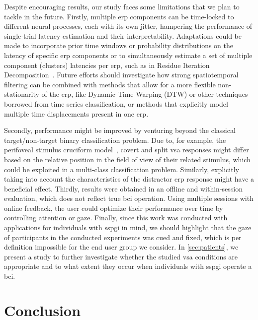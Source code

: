 Despite encouraging results, our study faces some limitations that we plan to
tackle in the future.
Firstly, multiple \ac{erp} components can be time-locked to different neural
processes, each with its own jitter, hampering the performance of
single-trial latency estimation and their interpretability.
Adaptations could be made to incorporate prior time windows or probability
distributions on the latency of specific \ac{erp} components or to simultaneously
estimate a set of multiple component (clusters) latencies per \ac{erp}, such as in Residue Iteration
Decomposition~\cite{Ouyang2017}.
Future efforts should investigate how strong
spatiotemporal filtering can be combined with methods that allow for a more
flexible non-stationarity of the \ac{erp}, like Dynamic Time Warping (DTW) or other
techniques borrowed from time series classification, or methods that explicitly model multiple time
displacements present in one \ac{erp}.


Secondly, performance might be improved by venturing beyond the classical
target/non-target binary classification problem.
Due to, for example, the perifoveal stimulus cruciform model~\cite{Vanegas2013}, covert and split \ac{vsa}
responses might differ based on the relative position in the field of view of
their related stimulus, which could be exploited in a multi-class classification
problem.
Similarly, explicitly taking into account the characteristics of the distractor \ac{erp}
response might have a beneficial effect.
Thirdly, results were obtained in an offline and within-session evaluation,
which does not reflect true \ac{bci} operation.
Using multiple sessions with online feedback, the user could optimize their
performance over time by controlling attention or gaze.
Finally, since this work was conducted with applications for individuals with
\ac{sspgi} in mind, we
should highlight that the gaze of participants in the conducted experiments was
cued and fixed, which is per definition impossible for the end user group we consider.
In \cref{sec:patients}, we present a study to further investigate whether the
studied \ac{vsa} conditions are appropriate and to what extent they occur when
individuals with \ac{sspgi} operate a \ac{bci}.

\section{Conclusion}

